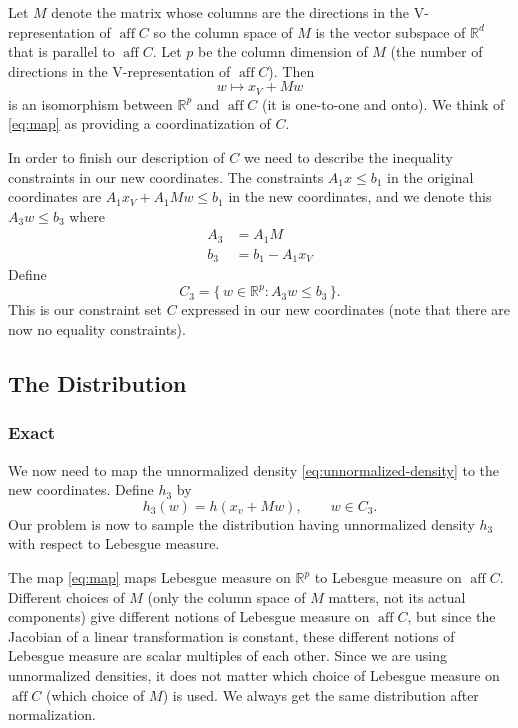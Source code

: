 \documentclass[11pt]{article}
\DeclareMathOperator{\aff}{aff}
\newcommand{\real}{\mathbb{R}}
\newcommand{\set}[1]{\{\, #1 \,\}}
\begin{document}
Let $M$ denote the matrix whose columns are the directions in the
V-representation of $\aff C$ so the column space of $M$ is the vector
subspace of $\real^d$ that is parallel to $\aff C$.  Let $p$ be the
column dimension of $M$ (the number of directions in the V-representation
of $\aff C$).  Then
\begin{equation} \label{eq:map}
   w \mapsto x_V + M w
\end{equation}
is an isomorphism between $\real^p$ and $\aff C$ (it is one-to-one and onto).
We think of \eqref{eq:map} as providing a coordinatization of $C$.

In order to finish our description of $C$ we need to describe the inequality
constraints in our new coordinates.  The constraints $A_1 x \le b_1$ in
the original coordinates are $A_1 x_V + A_1 M w \le b_1$
in the new coordinates, and we denote this $A_3 w \le b_3$ where
\begin{align*}
   A_3 & = A_1 M
   \\
   b_3 & = b_1 - A_1 x_V
\end{align*}
Define
$$
   C_3 = \set{ w \in \real^p : A_3 w \le b_3 }.
$$
This is our constraint set $C$ expressed in our new coordinates
(note that there are now no equality constraints).

\subsection{The Distribution}

\subsubsection{Exact}

We now need to map the unnormalized density \eqref{eq:unnormalized-density}
to the new coordinates.  Define $h_3$ by
$$
   h_3(w) = h(x_v + M w), \qquad w \in C_3.
$$
Our problem is now to sample the distribution having unnormalized density
$h_3$ with respect to Lebesgue measure.

The map \eqref{eq:map} maps Lebesgue measure on $\real^p$ to Lebesgue measure
on $\aff C$.  Different choices of $M$ (only the column space of $M$ matters,
not its actual components) give different notions of Lebesgue measure on
$\aff C$, but since the Jacobian of a linear transformation is constant,
these different notions of Lebesgue measure are scalar multiples of each other.
Since we are using unnormalized densities, it does not matter which choice
of Lebesgue measure on $\aff C$ (which choice of $M$) is used.
We always get the same distribution after normalization.
\end{document}
